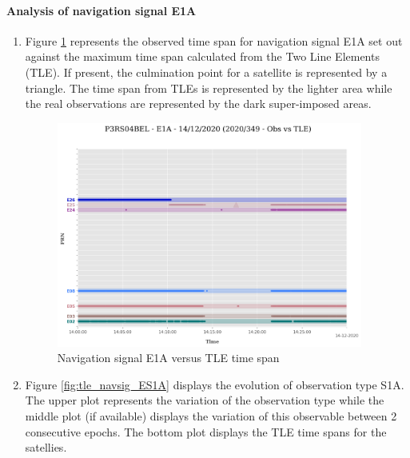 \paragraph{Analysis of navigation signal E1A}%
\label{para:AnalysisofnavigationsignalE1A}%
\newpage%
\begin{enumerate}%
\item%
Figure \ref{fig:tle_navsig_1AE} represents the observed time span for navigation signal E1A set out against the maximum time span calculated from the  Two Line Elements (TLE). If present, the culmination point for a satellite is represented by a triangle. The time span from TLEs is represented by the lighter area while the real observations are represented by the dark super-imposed areas.%


\begin{figure}[H]%
\centering%
\includegraphics[width=0.95\textwidth]{png/P3RS04BEL_R_20203490000_01D_00U_MO_E-E1A-TLE-arcs.png}%
\caption{\label{fig:tle_navsig_1AE} Navigation signal E1A versus TLE time span}%
\end{figure}

%
\item%
Figure \ref{fig:tle_navsig_ES1A} displays the evolution of observation type S1A. \newline The upper plot represents the variation of the observation type while the middle plot (if available) displays the variation of this observable between 2 consecutive epochs. The bottom plot displays the TLE time spans for the satellies.%



\end{enumerate}
